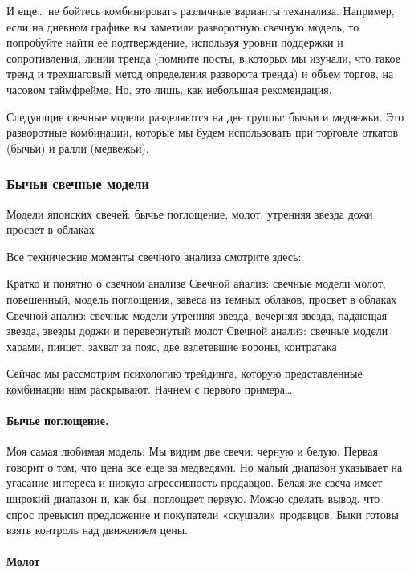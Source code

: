 \documentclass{book}
\begin{document}
И еще… не бойтесь комбинировать различные варианты теханализа. Например, если на дневном графике вы заметили разворотную свечную модель, то попробуйте найти её подтверждение, используя уровни поддержки и сопротивления, линии тренда (помните посты, в которых мы изучали, что такое тренд и трехшаговый метод определения разворота тренда) и объем торгов, на часовом таймфрейме. Но, это лишь, как небольшая рекомендация.

Следующие свечные модели разделяются на две группы: бычьи и
медвежьи. Это разворотные комбинации, которые мы будем использовать
при торговле откатов (бычьи) и ралли (медвежьи).

\subsubsection{Бычьи свечные модели}

Модели японских свечей: бычье поглощение, молот, утренняя звезда дожи просвет в облаках

Все технические моменты свечного анализа смотрите здесь:

    Кратко и понятно о свечном анализе
    Свечной анализ: свечные модели молот, повешенный, модель поглощения, завеса из темных облаков, просвет в облаках
    Свечной анализ: свечные модели утренняя звезда, вечерняя звезда, падающая звезда, звезды доджи и перевернутый молот
    Свечной анализ: свечные модели харами, пинцет, захват за пояс, две взлетевшие вороны, контратака

Сейчас мы рассмотрим психологию трейдинга, которую представленные
комбинации нам раскрывают. Начнем с первого примера…

\paragraph{Бычье поглощение.}

Моя самая любимая модель. Мы видим две свечи: черную и белую. Первая
говорит о том, что цена все еще за медведями. Но малый диапазон
указывает на угасание интереса и низкую агрессивность продавцов. Белая
же свеча имеет широкий диапазон и, как бы, поглощает первую. Можно
сделать вывод, что спрос превысил предложение и покупатели «скушали»
продавцов. Быки готовы взять контроль над движением цены.

\paragraph{Молот}
\end{document}
